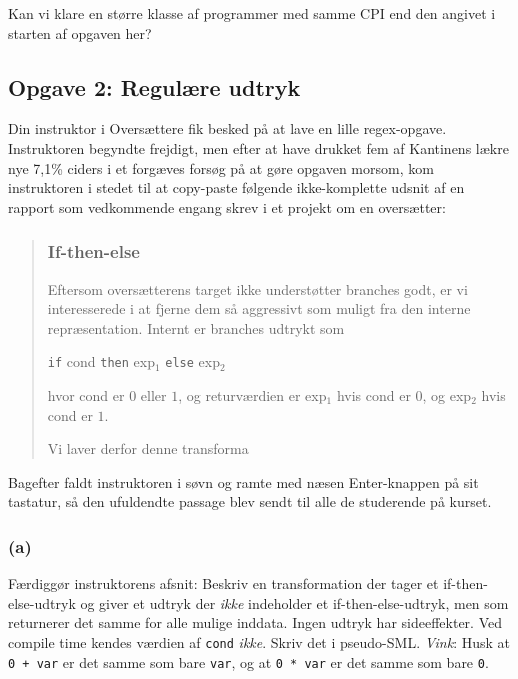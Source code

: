 Kan vi klare en større klasse af programmer med samme CPI end den angivet i
starten af opgaven her?


\subsection{Opgave 2: Regulære udtryk}

Din instruktor i Oversættere fik besked på at lave en lille regex-opgave.
Instruktoren begyndte frejdigt, men efter at have drukket fem af Kantinens lækre
nye 7,1\% ciders i et forgæves forsøg på at gøre opgaven morsom, kom
instruktoren i stedet til at copy-paste følgende ikke-komplette udsnit af en
rapport som vedkommende engang skrev i et projekt om en oversætter:

\begin{quote}
\subsubsection{If-then-else}

Eftersom oversætterens target ikke understøtter branches godt, er vi
interesserede i at fjerne dem så aggressivt som muligt fra den interne
repræsentation.  Internt er branches udtrykt som

\texttt{if} cond \texttt{then} exp$_1$ \texttt{else} exp$_2$

hvor cond er $0$ eller $1$, og returværdien er exp$_1$ hvis cond er $0$, og
exp$_2$ hvis cond er $1$.

Vi laver derfor denne transforma
\end{quote}

Bagefter faldt instruktoren i søvn og ramte med næsen Enter-knappen på sit
tastatur, så den ufuldendte passage blev sendt til alle de studerende på kurset.


\subsubsection{(a)}

Færdiggør instruktorens afsnit: Beskriv en transformation der tager et
if-then-else-udtryk og giver et udtryk der \emph{ikke} indeholder et
if-then-else-udtryk, men som returnerer det samme for alle mulige inddata.
Ingen udtryk har sideeffekter.  Ved compile time kendes værdien af \texttt{cond}
\emph{ikke}.  Skriv det i pseudo-SML.  \emph{Vink}: Husk at
\texttt{0 + var} er det samme som bare \texttt{var}, og at \texttt{0 * var} er
det samme som bare \texttt{0}.


